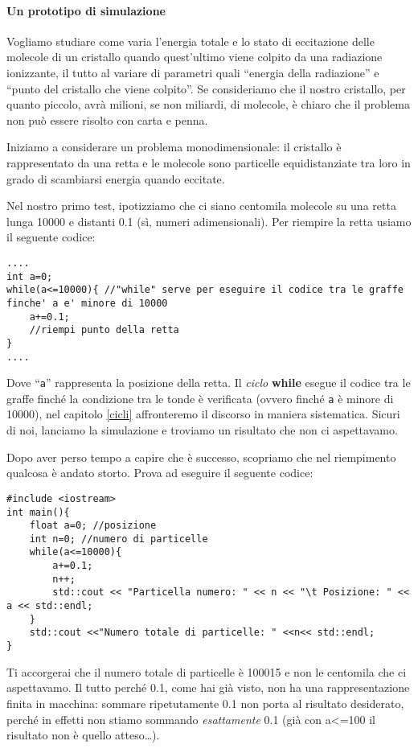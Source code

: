 	\paragraph{Un prototipo di simulazione} 	
	Vogliamo studiare come varia l'energia totale e lo stato di eccitazione delle molecole di un cristallo quando quest'ultimo viene colpito da una radiazione ionizzante, il tutto al variare di parametri quali ``energia della radiazione'' e ``punto del cristallo che viene colpito''. Se consideriamo che il nostro cristallo, per quanto piccolo, avrà milioni, se non miliardi, di molecole, è chiaro che il problema non può essere risolto con carta e penna. 
	
	Iniziamo a considerare un problema monodimensionale: il cristallo è rappresentato da una retta e le molecole sono particelle equidistanziate tra loro in grado di scambiarsi energia quando eccitate. 

	Nel nostro primo test, ipotizziamo che ci siano centomila molecole su una retta lunga 10000 e distanti 0.1 (sì, numeri adimensionali). Per riempire la retta usiamo il seguente codice:
	\begin{lstlisting}
....
int a=0;
while(a<=10000){ //"while" serve per eseguire il codice tra le graffe finche' a e' minore di 10000
	a+=0.1;
	//riempi punto della retta
}
....
	\end{lstlisting}
	Dove ``\verb|a|'' rappresenta la posizione della retta. Il \emph{ciclo} \textbf{while} esegue il codice tra le graffe finché la condizione tra le tonde è verificata (ovvero finché \verb|a| è minore di 10000), nel capitolo \ref{cicli} affronteremo il discorso in maniera sistematica. Sicuri di noi, lanciamo la simulazione e troviamo un risultato che non ci aspettavamo. 
	
	Dopo aver perso tempo a capire che è successo, scopriamo che nel riempimento qualcosa è andato storto. Prova ad eseguire il seguente codice:
	\begin{lstlisting}
#include <iostream>
int main(){
	float a=0; //posizione
	int n=0; //numero di particelle
	while(a<=10000){
		a+=0.1;
		n++;
		std::cout << "Particella numero: " << n << "\t Posizione: " << a << std::endl;
	}
	std::cout <<"Numero totale di particelle: " <<n<< std::endl;
}	
	\end{lstlisting}
	Ti accorgerai che il numero totale di particelle è 100015 e non le centomila che ci aspettavamo. Il tutto perché 0.1, come hai già visto, non ha una rappresentazione finita in macchina: sommare ripetutamente 0.1 non porta al risultato desiderato, perché in effetti non stiamo sommando \emph{esattamente} 0.1 (già con a<=100 il risultato non è quello atteso\ldots).
	
